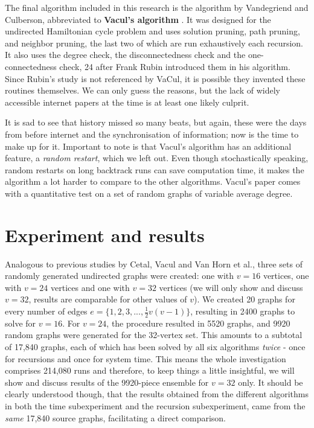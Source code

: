 \documentclass[10pt,conference,compsocconf]{IEEEtran}
\begin{document}
The final algorithm included in this research is the algorithm by Vandegriend and Culberson, abbreviated to \textbf{Vacul's algorithm} \cite{vandegriend1998gn}. It was designed for the undirected Hamiltonian cycle problem and uses solution pruning, path pruning, and neighbor pruning, the last two of which are run exhaustively each recursion. It also uses the degree check, the disconnectedness check and the one-connectedness check, 24 after Frank Rubin introduced them in his algorithm. Since Rubin's study is not referenced by VaCul, it is possible they invented these routines themselves. We can only guess the reasons, but the lack of widely accessible internet papers at the time is at least one likely culprit.

It is sad to see that history missed so many beats, but again, these were the days from before internet and the synchronisation of information; now is the time to make up for it. Important to note is that Vacul's algorithm has an additional feature, a \textit{random restart}, which we left out. Even though stochastically speaking, random restarts on long backtrack runs can save computation time, it makes the algorithm a lot harder to compare to the other algorithms. Vacul's paper comes with a quantitative test on a set of random graphs of variable average degree.



\section{Experiment and results}
\noindent Analogous to previous studies by Cetal, Vacul and Van Horn et al., three sets of randomly generated undirected graphs were created: one with $v=16$ vertices, one with $v=24$ vertices and one with $v=32$ vertices (we will only show and discuss $v=32$, results are comparable for other values of $v$). We created 20 graphs for every number of edges $e = \{1, 2, 3, ... , \frac{1}{2}v(v-1)\}$, resulting in 2400 graphs to solve for $v=16$. For $v=24$, the procedure resulted in 5520 graphs, and 9920 random graphs were generated for the 32-vertex set. This amounts to a subtotal of 17,840 graphs, each of which has been solved by all six algorithms \textit{twice} - once for recursions and once for system time. This means the whole investigation comprises 214,080 runs and therefore, to keep things a little insightful, we will show and discuss results of the 9920-piece ensemble for $v=32$ only. It should be clearly understood though, that the results obtained from the different algorithms in both the time subexperiment and the recursion subexperiment, came from the \textit{same} 17,840 source graphs, facilitating a direct comparison.
\end{document}
